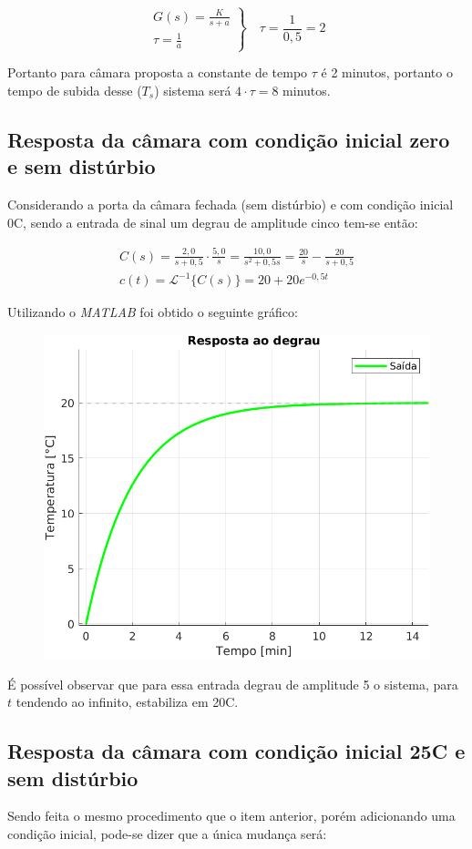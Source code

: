 \documentclass[a4paper,12pt]{article}
\begin{document}
		\begin{equation}
			\left.
			\begin{array}{c}
				\displaystyle G(s) = \frac{K}{s+a} \\[20pt]
				\displaystyle \tau = \frac{1}{a}
			\end{array}
			\right\}
			\quad \tau = \frac{1}{0,5} = 2
		\end{equation}
	
		Portanto para câmara proposta a constante de tempo $\tau$ é 2 minutos, portanto o tempo de subida desse ($T_s$) sistema será $4 \cdot \tau = 8$ minutos.
	
	\subsection{Resposta da câmara com condição inicial zero e sem distúrbio}
		Considerando a porta da câmara fechada (sem distúrbio) e com condição inicial 0\degree C, sendo a entrada de sinal um degrau de amplitude cinco tem-se então:
		

		\begin{gather}
			C(s) = \frac{2,0}{s+0,5} \cdot \frac{5,0}{s} = \frac{10,0}{s^2 + 0,5s} = \frac{20}{s} - \frac{20}{s+0,5} \\[20pt]
			c(t) = \mathcal{L}^{-1} \{ C(s) \} = 20 + 20e^{-0,5t}
		\end{gather}
	
		Utilizando o \textit{MATLAB} foi obtido o seguinte gráfico:
		
		\begin{figure}[H]
			\centering
			\includegraphics[width=0.5\linewidth]{images/respb.png}
			\label{fig:resposta_b}
		\end{figure}
	
		É possível observar que para essa entrada degrau de amplitude 5 o sistema, para $t$ tendendo ao infinito, estabiliza em 20\degree C.
		
	\subsection{Resposta da câmara com condição inicial 25\degree C e sem distúrbio}
		Sendo feita o mesmo procedimento que o item anterior, porém adicionando uma condição inicial, pode-se dizer que a única mudança será:
		
\end{document}
